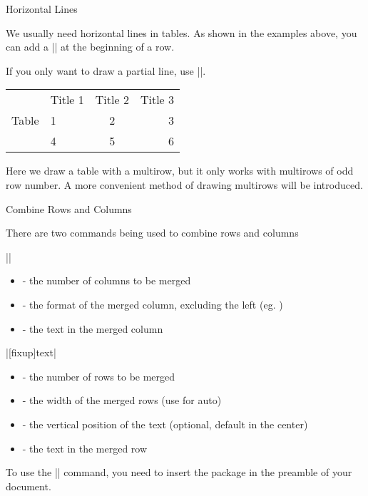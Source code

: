 \begin{frame}[fragile]{Horizontal Lines}

We usually need horizontal lines in tables. As shown in the examples above, you can add a \LC|\hline| at the beginning of a row. \medskip

If you only want to draw a partial line, use \LC||.

\begin{latexexamplesplit}
\begin{tabular}{c|l|c|r}
  \hline\hline
  & Title 1 & Title 2 & Title 3 \\
  \cline{2-4}
  Table & 1 & 2 & 3 \\
  \cline{2-4}
  & 4 & 5 & 6 \\
  \hline\hline
\end{tabular}
\end{latexexamplesplit}


Here we draw a table with a multirow, but it only works with multirows of odd row number. A more convenient method of drawing multirows will be introduced.

\end{frame}

\begin{frame}[fragile]{Combine Rows and Columns}

There are two commands being used to combine rows and columns
\begin{command}
\LC||

\begin{itemize}
	\item {} - the number of columns to be merged
	\item {} - the format of the merged column, excluding the left \packagename{|} (eg. )
	\item {} - the text in the merged column
\end{itemize}

\LC|[fixup]{text}|

\begin{itemize}
	\item {} - the number of rows to be merged
	\item {} - the width of the merged rows (use \packagename{*} for auto)
	\item {} - the vertical position of the text (optional, default in the center)
	\item {} - the text in the merged row
\end{itemize}	

\end{command}

To use the \LC|\multirow| command, you need to insert the package  in the preamble of your document.

\end{frame}



